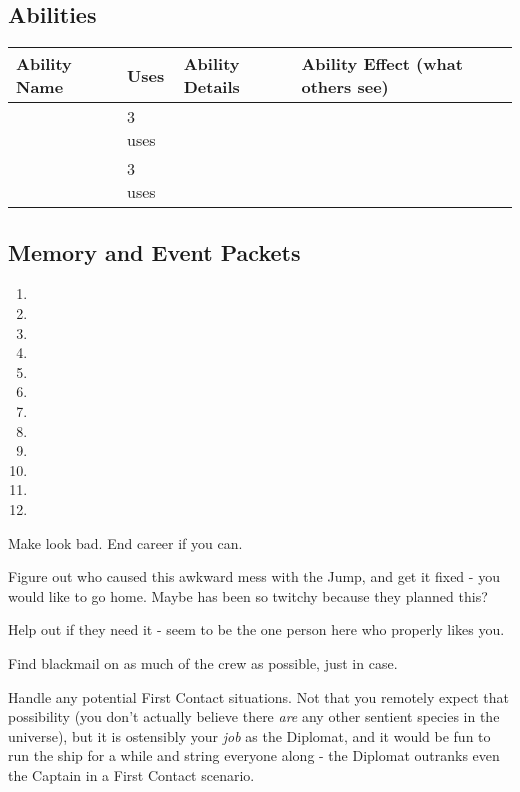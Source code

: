 \documentclass[char]{TMFHope}
\begin{document}
\subsection*{Abilities}
\begin{tabular}{|p{3cm}|p{1.5cm}|p{7cm}|p{4.5cm}|} 
 \hline
 \textbf{Ability Name} & \textbf{Uses} & \textbf{Ability Details} & \textbf{Ability Effect (what others see)} \\ 
\hline 
 \aNegotiation{\MYname} & 3 uses & \aNegotiation{\MYtext} & \aNegotiation{\MYeffect} \\ 
\hline
 \aFirstAid{\MYname} & 3 uses & \aFirstAid{\MYtext} & \aFirstAid{\MYeffect}\\ 
 \hline
\end{tabular}

\subsection*{Memory and Event Packets}
\begin{enumerate}
	\item \mPractice{\MYname}
	\item \mDAlpha{\MYname}
	\item \mDiplomatOne{\MYname}
	\item \mDiplomatTwo{\MYname}
	\item \mDiplomatThree{\MYname}
	\item \mBroom{\MYname}
	\item \mLab{\MYname}
	\item \mPatient{\MYname}
	\item \mKitchen{\MYname}
	\item \mWeight{\MYname}
	\item \mTheater{\MYname}
	\item \mCrates{\MYname}
\end{enumerate}

\begin{itemz}[Goals]
	\item Make \cWeap{} look bad. End \cWeap{\their} career if you can.
	\item Figure out who caused this awkward mess with the Jump, and get it fixed - you would like to go home. Maybe \cXO{} has been so twitchy because they planned this?
	\item Help \cMed{} out if they need it - \cMed{\they} seem\cMed{\plural} to be the one person here who properly likes you.
	\item Find blackmail on as much of the crew as possible, just in case.
	\item Handle any potential First Contact situations. Not that you remotely expect that possibility (you don't actually believe there \emph{are} any other sentient species in the universe), but it is ostensibly your \emph{job} as the Diplomat, and it would be fun to run the ship for a while and string everyone along - the Diplomat outranks even the Captain in a First Contact scenario.
\end{itemz}
\end{document}
